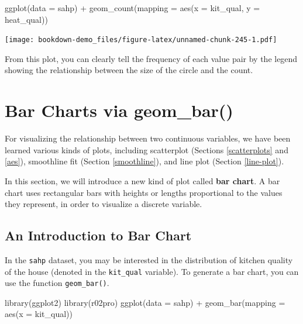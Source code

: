 \documentclass[
]{book}
\newenvironment{Shaded}{\begin{snugshade}}{\end{snugshade}}
\newcommand{\AttributeTok}[1]{\textcolor[rgb]{0.77,0.63,0.00}{#1}}
\newcommand{\FunctionTok}[1]{\textcolor[rgb]{0.00,0.00,0.00}{#1}}
\newcommand{\NormalTok}[1]{#1}
\newcommand{\SpecialCharTok}[1]{\textcolor[rgb]{0.00,0.00,0.00}{#1}}
\begin{document}
\begin{Shaded}
\begin{Highlighting}[]
\FunctionTok{ggplot}\NormalTok{(}\AttributeTok{data =}\NormalTok{ sahp) }\SpecialCharTok{+} \FunctionTok{geom\_count}\NormalTok{(}\AttributeTok{mapping =} \FunctionTok{aes}\NormalTok{(}\AttributeTok{x =}\NormalTok{ kit\_qual, }\AttributeTok{y =}\NormalTok{ heat\_qual))}
\end{Highlighting}
\end{Shaded}

\texttt{[image: bookdown-demo\_files/figure-latex/unnamed-chunk-245-1.pdf]}

From this plot, you can clearly tell the frequency of each value pair by the legend showing the relationship between the size of the circle and the count.

\hypertarget{bar-charts}{%
\section{Bar Charts via geom\_bar()}\label{bar-charts}}

For visualizing the relationship between two continuous variables, we have been learned various kinds of plots, including scatterplot (Sections \ref{scatterplots} and \ref{aes}), smoothline fit (Section \ref{smoothline}), and line plot (Section \ref{line-plot}).

In this section, we will introduce a new kind of plot called \textbf{bar chart}. A bar chart uses rectangular bars with heights or lengths proportional to the values they represent, in order to visualize a discrete variable.

\hypertarget{an-introduction-to-bar-chart}{%
\subsection{An Introduction to Bar Chart}\label{an-introduction-to-bar-chart}}

In the \texttt{sahp} dataset, you may be interested in the distribution of kitchen quality of the house (denoted in the \texttt{kit\_qual} variable). To generate a bar chart, you can use the function \texttt{geom\_bar()}.

\begin{Shaded}
\begin{Highlighting}[]
\FunctionTok{library}\NormalTok{(ggplot2)}
\FunctionTok{library}\NormalTok{(r02pro)}
\FunctionTok{ggplot}\NormalTok{(}\AttributeTok{data =}\NormalTok{ sahp) }\SpecialCharTok{+} \FunctionTok{geom\_bar}\NormalTok{(}\AttributeTok{mapping =} \FunctionTok{aes}\NormalTok{(}\AttributeTok{x =}\NormalTok{ kit\_qual))}
\end{Highlighting}
\end{Shaded}
\end{document}
